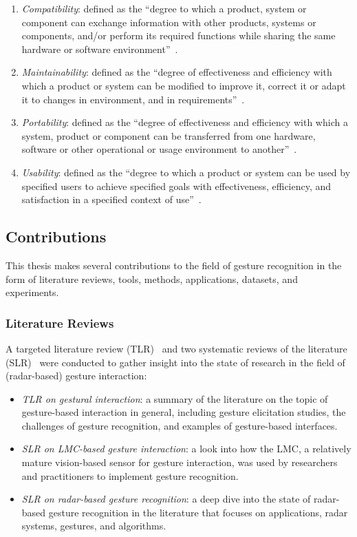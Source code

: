 \begin{enumerate}[label=\textit{P\arabic*}]
    \item \textit{Compatibility}: defined as the ``degree to which a product, system or component can exchange information with other products, systems or components, and/or perform its required functions while sharing the same hardware or software environment''~\cite{iso25010}.
    \item \textit{Maintainability}: defined as the ``degree of effectiveness and efficiency with which a product or system can be modified to improve it, correct it or adapt it to changes in environment, and in requirements''~\cite{iso25010}.
    \item \textit{Portability}: defined as the ``degree of effectiveness and efficiency with which a system, product or component can be transferred from one hardware, software or other operational or usage environment to another''~\cite{iso25010}.
    \item \textit{Usability}: defined as the ``degree to which a product or system can be used by specified users to achieve specified goals with effectiveness, efficiency, and satisfaction in a specified context of use''~\cite{iso25010}.
\end{enumerate}

\subsection{Contributions}
This thesis makes several contributions to the field of gesture recognition in the form of literature reviews, tools, methods, applications, datasets, and experiments.

\subsubsection{Literature Reviews}
A targeted literature review (TLR)~\cite{Kysh:2013} and two systematic reviews of the literature (SLR)~\cite{Kitchenham:2010} were conducted to gather insight into the state of research in the field of (radar-based) gesture interaction:
\begin{itemize}
    \item \textit{TLR on gestural interaction}: a summary of the literature on the topic of gesture-based interaction in general, including gesture elicitation studies, the challenges of gesture recognition, and examples of gesture-based interfaces.
    \item \textit{SLR on LMC-based gesture interaction}: a look into how the LMC, a relatively mature vision-based sensor for gesture interaction, was used by researchers and practitioners to implement gesture recognition.
    \item \textit{SLR on radar-based gesture recognition}: a deep dive into the state of radar-based gesture recognition in the literature that focuses on applications, radar systems, gestures, and algorithms.
\end{itemize}

